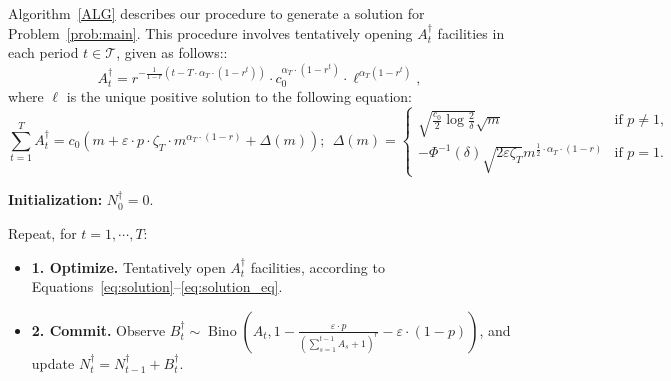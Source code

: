 \documentclass[nonblindrev]{informs3noheader}
\DeclareMathOperator\Bino{Bino}
\def\calT{\mathcal{T}}
\begin{document}
Algorithm~\ref{ALG} describes our procedure to generate a solution for Problem~\eqref{prob:main}. This procedure involves tentatively opening $A^\dagger_t$ facilities in each period $t\in\calT$, given as follows::
\begin{equation}\label{eq:solution}
        A^\dagger_t=
            r^{-\frac{1}{1-r}\left(t-T\cdot\alpha_T\cdot(1-r^t)\right)}\cdot c_0^{\alpha_T\cdot(1-r^t)}\cdot \ell^{\alpha_T(1-r^t)},
\end{equation}
where $\ell$ is the unique positive solution to the following equation:
\begin{equation} \label{eq:solution_eq}
\sum_{t=1}^T A^\dagger_t= c_0 \left(m + \varepsilon\cdot p\cdot\zeta_T\cdot m^{\alpha_T\cdot(1-r)}+ \Delta(m)\right);\   \ \Delta(m) = \begin{cases}
    \sqrt{\frac{c_0}{2}\log \frac{2}{\delta}}\sqrt{m} & \text{if }p \neq 1,\\
    -\Phi^{-1}(\delta) \sqrt{2\varepsilon \zeta_T} m^{\frac{1}{2}\cdot \alpha_T \cdot (1-r)}& \text{if }p = 1.
\end{cases}
\end{equation}
\begin{algorithm} [h!]
\caption{Algorithm to solve Problem~\eqref{prob:main}.}\small
\label{ALG}
\begin{algorithmic}
\item \textbf{Initialization:} $N^\dagger_0=0$.
\item Repeat, for $t=1,\cdots,T$:
\begin{itemize}
    \item[] \textbf{1. Optimize.} Tentatively open $A^\dagger_t$ facilities, according to Equations~\eqref{eq:solution}--\eqref{eq:solution_eq}.
    \item[] \textbf{2. Commit.} Observe $B^\dagger_t\sim \Bino\left(A_t, 1- \frac{\varepsilon\cdot p}{\left(\sum_{s=1}^{t-1} A_s +1\right)^r}-\varepsilon\cdot(1-p)\right)$, and update $N^\dagger_t=N^\dagger_{t-1} + B^\dagger_t$.
\end{itemize}
\end{algorithmic}
\end{algorithm}
\end{document}
